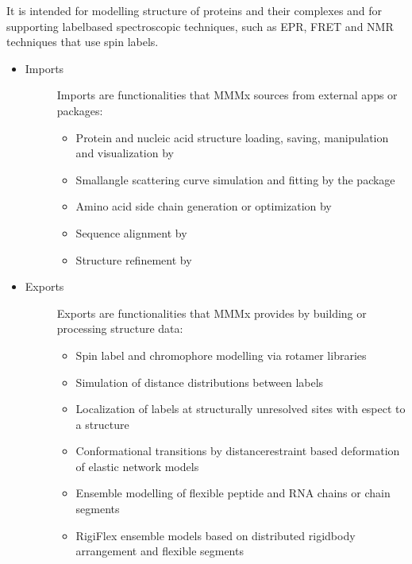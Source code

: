 \documentclass[letterpaper,10pt,english]{sphinxmanual}
\begin{document}
It is intended for modelling structure of proteins and their complexes and for supporting label\sphinxhyphen{}based spectroscopic techniques, such as EPR, FRET and NMR techniques that use spin labels.
\begin{itemize}
\item {} \begin{description}
\item[{Imports}] \leavevmode
Imports are functionalities that MMMx sources from external apps or packages:
\begin{itemize}
\item {} 
Protein and nucleic acid structure loading, saving, manipulation and visualization by 

\item {} 
Small\sphinxhyphen{}angle scattering curve simulation and fitting by the  package

\item {} 
Amino acid side chain generation or optimization by 

\item {} 
Sequence alignment by 

\item {} 
Structure refinement by 

\end{itemize}

\end{description}

\item {} \begin{description}
\item[{Exports}] \leavevmode
Exports are functionalities that MMMx provides by building or processing structure data:
\begin{itemize}
\item {} 
Spin label and chromophore modelling via rotamer libraries

\item {} 
Simulation of distance distributions between labels

\item {} 
Localization of labels at structurally unresolved sites with espect to a structure

\item {} 
Conformational transitions by distance\sphinxhyphen{}restraint based deformation of elastic network models

\item {} 
Ensemble modelling of flexible peptide and RNA chains or chain segments

\item {} 
RigiFlex ensemble models based on distributed rigid\sphinxhyphen{}body arrangement and flexible segments

\end{itemize}

\end{description}

\end{itemize}
\end{document}
